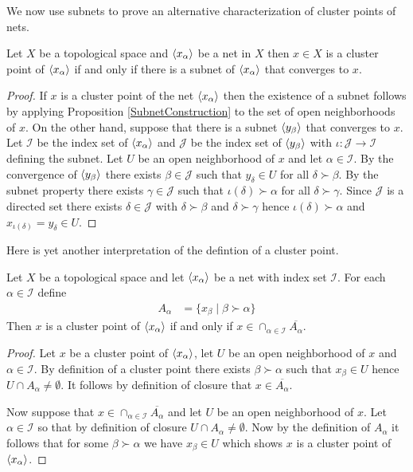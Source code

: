 We now use subnets to prove an alternative characterization of cluster points of nets.
\begin{prop}\label{ClusterPointsAndSubnets}Let $X$ be a topological space and $\langle x_{\alpha} \rangle$ be a net in $X$ then $x \in X$ is a cluster point of $\langle x_{\alpha} \rangle$ if and only if there is a 
subnet of $\langle x_{\alpha} \rangle$ that converges to $x$.
\end{prop}
\begin{proof}
If $x$ is a cluster point of the net $\langle x_{\alpha} \rangle$ then the existence of a subnet follows by applying Proposition \ref{SubnetConstruction} to the set of open neighborhoods of $x$.  On the other hand, suppose that there is a subnet $\langle y_{\beta} \rangle$ that converges to $x$.  Let $\mathcal{I}$ be the index set of $\langle x_{\alpha} \rangle$ and $\mathcal{J}$ be the index set of $\langle y_{\beta} \rangle$ with $\iota : \mathcal{J} \to \mathcal{I}$ defining the subnet.  Let $U$ be an open neighborhood of $x$ and let $\alpha \in \mathcal{I}$. By the convergence of $\langle y_{\beta} \rangle$ there exists $\beta \in \mathcal{J}$ such that $y_\delta \in U$ for all $\delta \succ \beta$.  By the subnet property there exists $\gamma \in \mathcal{J}$ such that $\iota(\delta) \succ \alpha$ for all $\delta \succ \gamma$.  Since $\mathcal{J}$ is a directed set there exists $\delta \in \mathcal{J}$ with $\delta \succ \beta$ and $\delta \succ \gamma$ hence $\iota(\delta) \succ \alpha$ and $x_{\iota(\delta)} = y_\delta \in U$.
\end{proof}

Here is yet another interpretation of the defintion of a cluster point.
\begin{lem}\label{ClusterPointsAndClosures}Let $X$ be a topological space and let $\langle x_{\alpha} \rangle$ be a net with index set $\mathcal{I}$.  For each $\alpha \in \mathcal{I}$ define
\begin{align*}
A_\alpha &= \lbrace x_\beta \mid \beta \succ \alpha \rbrace
\end{align*}
Then $x$ is a cluster point of $\langle x_{\alpha} \rangle$ if and only if $x \in \cap_{\alpha \in \mathcal{I}} \overline{A_\alpha}$.
\end{lem}
\begin{proof}
Let $x$ be a cluster point of $\langle x_{\alpha} \rangle$, let $U$ be an open neighborhood of $x$ and $\alpha \in \mathcal{I}$.  By definition of a cluster point there exists $\beta \succ \alpha$ such that $x_\beta \in U$ hence $U \cap A_\alpha \neq \emptyset$.  It follows by definition of closure that $x \in \overline{A_\alpha}$.

Now suppose that $x \in \cap_{\alpha \in \mathcal{I}} \overline{A_\alpha}$ and let $U$ be an open neighborhood of $x$.  Let $\alpha \in \mathcal{I}$ so that by definition of closure $U \cap A_\alpha \neq \emptyset$.  Now by the definition of $A_\alpha$ it follows that for some $\beta \succ \alpha$ we have $x_\beta \in U$ which shows $x$ is a cluster point of $\langle x_{\alpha} \rangle$.
\end{proof}


